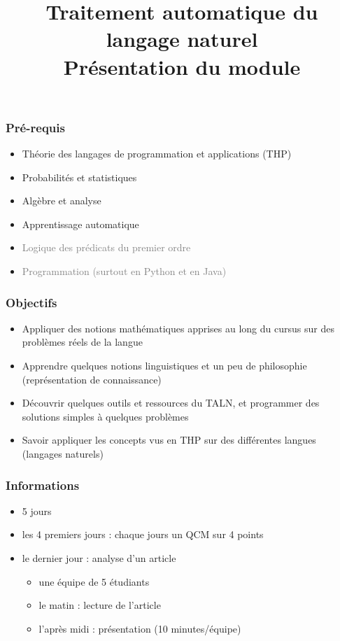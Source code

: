 \documentclass{beamer}
\title[TALN : Présentation] %
{Traitement automatique du langage naturel\\Présentation du module}
\begin{document}
\begin{frame}
\frametitle{Pré-requis}

\begin{itemize}
	\item Théorie des langages de programmation et applications (THP)
	\item Probabilités et statistiques
	\item Algèbre et analyse 
	\item Apprentissage automatique 
	\item \textcolor{gray}{Logique des prédicats du premier ordre}
	\item \textcolor{gray}{Programmation (surtout en Python et en Java)}
\end{itemize}

\end{frame}


\begin{frame}
\frametitle{Objectifs}

\begin{itemize}
	\item Appliquer des notions mathématiques apprises au long du cursus sur des problèmes réels de la langue 
	\item Apprendre quelques notions linguistiques et un peu de philosophie (représentation de connaissance) 
	\item Découvrir quelques outils et ressources du TALN, et programmer des solutions simples à quelques problèmes
	\item Savoir appliquer les concepts vus en THP sur des différentes langues (langages naturels)
\end{itemize}

\end{frame}


\begin{frame}
\frametitle{Informations}

\begin{itemize}
	\item 5 jours 
	\item les 4 premiers jours : chaque jours un QCM sur 4 points
	\item le dernier jour : analyse d'un article
	\begin{itemize}
		\item une équipe de 5 étudiants
		\item le matin : lecture de l'article
		\item l'après midi : présentation (10 minutes/équipe)
	\end{itemize}
\end{itemize}

\end{frame}
\end{document}
